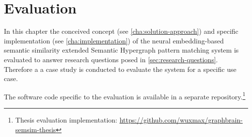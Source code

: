 \documentclass[11pt, numbers=noenddot]{scrreprt}
\begin{document}
%
%






\chapter{Evaluation}
\label{cha:evaluation}
In this chapter the conceived concept (see \cref{cha:solution-approach}) and specific implementation (see \cref{cha:implementation}) of the neural embedding-based semantic similarity extended Semantic Hypergraph pattern matching system is evaluated to answer research questions posed in \cref{sec:research-questions}.  Therefore a a case study is conducted to evaluate the system for a specific use case. 

The software code specific to the evaluation is available in a separate repository.\footnote{Thesis evaluation implementation: \url{https://github.com/wuxmax/graphbrain-semsim-thesis}}
\end{document}
